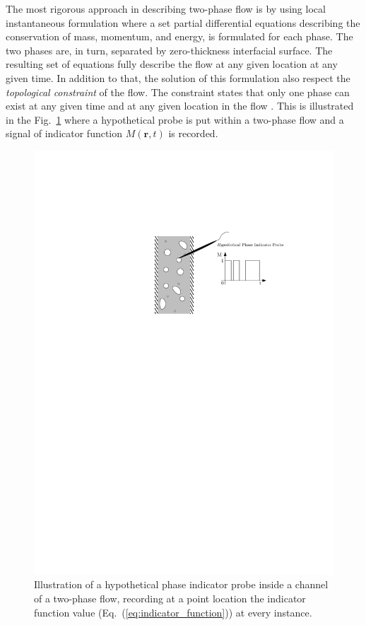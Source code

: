 The most rigorous approach in describing two-phase flow is by using local instantaneous formulation where a set partial differential equations describing the conservation of mass, momentum, and energy, is formulated for each phase.
The two phases are, in turn, separated by zero-thickness interfacial surface.
The resulting set of equations fully describe the flow at any given location at any given time.
In addition to that, the solution of this formulation also respect the \emph{topological constraint} of the flow.
The constraint states that only one phase can exist at any given time and at any given location in the flow \cite{Ghiaasiaan2007}.
This is illustrated in the Fig.~\ref{fig:phase_indicator_probe} where a hypothetical probe is put within a two-phase flow and a signal of indicator function $M(\mathbf{r}, t)$ is recorded.
\begin{figure}[bth!]
	\centering
	\includegraphics[scale=0.70]{../figures/phaseIndicatorProbe/phaseIndicatorProbe.pdf}
	\caption[A hypothetical phase indicator probe inside a channel of a two-phase flow]{Illustration of a hypothetical phase indicator probe inside a channel of a two-phase flow, recording at a point location the indicator function value (Eq.~(\ref{eq:indicator_function})) at every instance.}
	\label{fig:phase_indicator_probe}
\end{figure}
